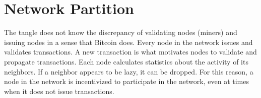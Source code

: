 \section{Network Partition}

The tangle does not know the discrepancy of validating nodes (miners) and issuing nodes in a sense that Bitcoin does. Every node in the network issues and validates transactions. A new transaction is  
what motivates nodes to validate and propagate transactions. Each node calculates statistics about the activity of its neighbors. If a neighbor appears to be lazy, it can be dropped. For this reason, a node in the network is incentivized to participate in the network, even at times when it does not issue transactions. 
